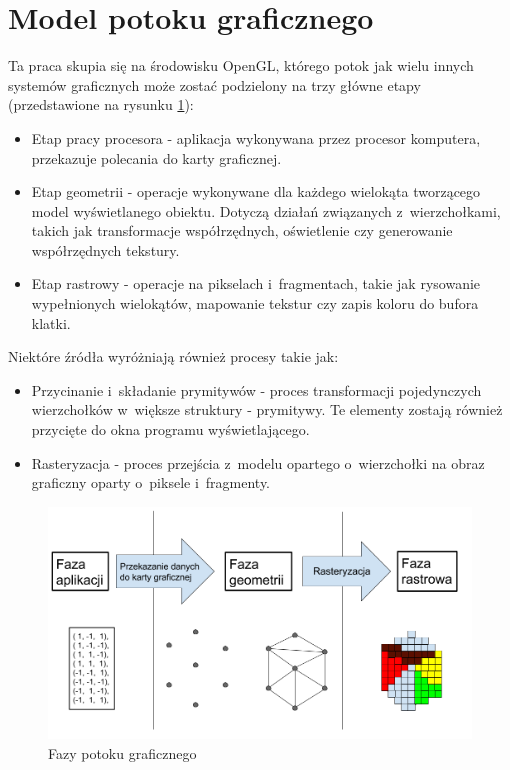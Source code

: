 \documentclass[a4paper,twoside,12pt]{book}
\begin{document}
\section{Model potoku graficznego}
Ta praca skupia się na środowisku OpenGL, którego potok jak wielu innych systemów graficznych może zostać podzielony na trzy główne etapy (przedstawione na rysunku \ref{fig:pipeline_flow}):
\begin{itemize}
    \item Etap pracy procesora - aplikacja wykonywana przez procesor komputera, przekazuje polecania do karty graficznej.
    \item Etap geometrii - operacje wykonywane dla każdego wielokąta tworzącego model wyświetlanego obiektu. Dotyczą działań związanych z~wierzchołkami, takich jak transformacje współrzędnych, oświetlenie czy generowanie współrzędnych tekstury. \cite{bib:opengl_insights}
    \item Etap rastrowy - operacje na pikselach i~fragmentach, takie jak rysowanie wypełnionych wielokątów, mapowanie tekstur czy zapis koloru do bufora klatki.
\end{itemize}

\vbox{}

Niektóre źródła \cite{bib:top-down} wyróżniają również procesy takie jak: 
\begin{itemize}
    \item Przycinanie i~składanie prymitywów - proces transformacji pojedynczych wierzchołków w~większe struktury - prymitywy. Te elementy zostają również przycięte do okna programu wyświetlającego.
    \item Rasteryzacja - proces przejścia z~modelu opartego o~wierzchołki na obraz graficzny oparty o~piksele i~fragmenty.
\end{itemize}

\begin{figure}[H]
    \centering
    \includegraphics[width=\textwidth]{res/pipeline_flow.png}
    \caption{Fazy potoku graficznego}
    \label{fig:pipeline_flow}
\end{figure}
\end{document}
